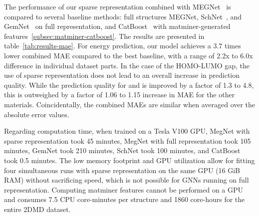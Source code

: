     The performance of our sparse representation combined with MEGNet~\cite{chen2019graph} is compared to several baseline methods: full structures MEGNet, SchNet~\cite{schutt2018schnet}, and GemNet~\cite{GemNet} on full representation, and CatBoost~\cite{prokhorenkova2018catboost} with matminer-generated features~\ref{subsec:matminer-catboost}. The results are presented in table~\ref{tab:results-mae}. For energy prediction, our model achieves a $3.7$ times lower combined MAE compared to the best baseline, with a range of 2.2x to 6.0x difference in individual dataset parts. In the case of the HOMO-LUMO gap, the use of sparse representation does not lead to an overall increase in prediction quality. While the prediction quality for  and  is improved by a factor of 1.3 to 4.8, this is outweighed by a factor of 1.06 to 1.15 increase in MAE for the other materials. Coincidentally, the combined MAEs are similar when averaged over the absolute error values.
    
    Regarding computation time, when trained on a Tesla V100 GPU, MegNet with sparse representation took 45 minutes, MegNet with full representation took 105 minutes, GemNet took 210 minutes, SchNet took 100 minutes, and CatBoost took 0.5 minutes. The low memory footprint and GPU utilization allow for fitting four simultaneous runs with sparse representation on the same GPU (16 GiB RAM) without sacrificing speed, which is not possible for GNNs running on full representation. Computing matminer features cannot be performed on a GPU and consumes 7.5 CPU core-minutes per structure and 1860 core-hours for the entire 2DMD dataset. 
    
